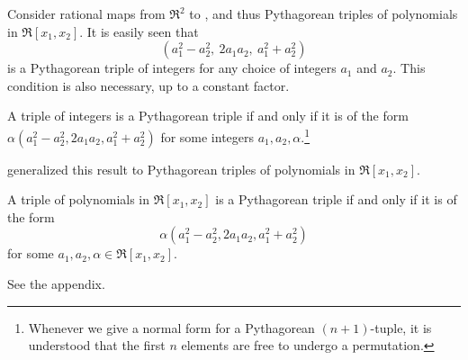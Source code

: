 Consider rational maps from $\Re^2$ to ,
and thus Pythagorean triples of polynomials in $\Re[x_1,x_2]$.
It is easily seen that 
\[ (a_1^2 - a_2^2,\ 2a_1a_2,\ a_1^2 + a_2^2)
\]
is a Pythagorean triple
of integers for any choice of integers $a_1$ and $a_2$.
This condition is also necessary, up to a constant factor.
%
\begin{lemma}[Classical]
\label{lem:classical}
A triple of integers is a Pythagorean triple if and only if
it is of the form $\alpha(a_1^2 - a_2^2, 2a_1a_2, a_1^2 + a_2^2)$ 
for some integers $a_1,a_2,\alpha$.\footnote{Whenever
	we give a normal form for a Pythagorean $(n+1)$-tuple,
	it is understood that the first $n$ elements are free to undergo
	a permutation.}
\end{lemma}
%
\cite{kubota72} generalized this result
to Pythagorean triples of polynomials in $\Re[x_1,x_2]$.
%
\begin{lemma}[Kubota 1972]
\label{lem:kubota}
A triple of polynomials in $\Re[x_1,x_2]$ is a Pythagorean triple 
if and only if it is of the form 
\begin{equation}
\label{eq:triple}
	\alpha(a_1^2 - a_2^2, 2a_1a_2, a_1^2 + a_2^2)
\end{equation}
for some $a_1,a_2,\alpha \in \Re[x_1,x_2]$.
\end{lemma}
\prf
See the appendix.
\QED

